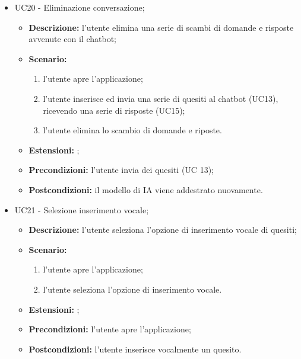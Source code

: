\documentclass[10pt, a4paper]{article}
\begin{document}
\begin{itemize}
     \item UC20 - Eliminazione conversazione;
    \begin{itemize}
        \item \textbf{Descrizione: }l'utente elimina una serie di scambi di domande e risposte avvenute con il chatbot;
        \item \textbf{Scenario: }
        \begin{enumerate}[label={\arabic*.}, align=left]
        \item l'utente apre l'applicazione;
        \item l'utente inserisce ed invia una serie di quesiti al chatbot (UC13), ricevendo una serie di risposte (UC15);
        \item l'utente elimina lo scambio di domande e riposte.
        \end{enumerate}
        \item \textbf{Estensioni: };
        \item \textbf{Precondizioni:} l'utente invia dei quesiti (UC 13);
        \item \textbf{Postcondizioni: }il modello di IA viene addestrato nuovamente.\\
    \end{itemize}

    \item UC21 - Selezione inserimento vocale;
    \begin{itemize}
        \item \textbf{Descrizione: }l'utente seleziona l'opzione di inserimento vocale di quesiti;
        \item \textbf{Scenario: }
        \begin{enumerate}[label={\arabic*.}, align=left]
        \item l'utente apre l'applicazione;
        \item l'utente seleziona l'opzione di inserimento vocale.
        \end{enumerate}
        \item \textbf{Estensioni: };
        \item \textbf{Precondizioni:} l'utente apre l'applicazione;
        \item \textbf{Postcondizioni: }l'utente inserisce vocalmente un quesito.\\
    \end{itemize}

    
\end{itemize}
\end{document}
